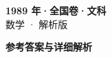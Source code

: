 \documentclass[zihao=-4, a4paper]{ctexart}
\begin{document}
\begin{center}
  {\Large\bfseries 1989 年·全国卷·文科}\\[4pt]
  {\large 数学 · 解析版}
\end{center}
\medskip
{}

\clearpage
{}
\begin{center}{\Large\bfseries 参考答案与详细解析}\end{center}
\medskip

\end{document}
